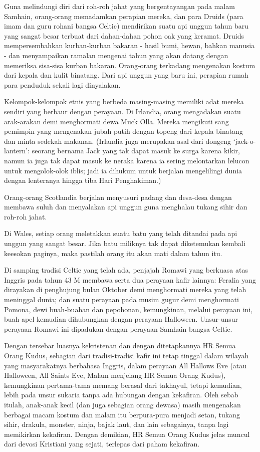 Guna melindungi diri dari roh-roh jahat yang bergentayangan pada malam Samhain, orang-orang memadamkan perapian mereka, dan para Druids (para imam dan guru rohani bangsa Celtic) mendirikan suatu api unggun tahun baru yang sangat besar terbuat dari dahan-dahan pohon oak yang keramat. Druids mempersembahkan kurban-kurban bakaran - hasil bumi, hewan, bahkan manusia - dan menyampaikan ramalan mengenai tahun yang akan datang dengan memeriksa sisa-sisa kurban bakaran. Orang-orang terkadang mengenakan kostum dari kepala dan kulit binatang. Dari api unggun yang baru ini, perapian rumah para penduduk sekali lagi dinyalakan.

Kelompok-kelompok etnis yang berbeda masing-masing memiliki adat mereka sendiri yang berbaur dengan perayaan. Di Irlandia, orang mengadakan suatu arak-arakan demi menghormati dewa Muck Olla. Mereka mengikuti sang pemimpin yang mengenakan jubah putih dengan topeng dari kepala binatang dan minta sedekah makanan. (Irlandia juga merupakan asal dari dongeng `jack-o-lantern': seorang bernama Jack yang tak dapat masuk ke surga karena kikir, namun ia juga tak dapat masuk ke neraka karena ia sering melontarkan lelucon untuk mengolok-olok iblis; jadi ia dihukum untuk berjalan mengelilingi dunia dengan lenteranya hingga tiba Hari Penghakiman.)

Orang-orang Scotlandia berjalan menyusuri padang dan desa-desa dengan membawa suluh dan menyalakan api unggun guna menghalau tukang sihir dan roh-roh jahat.

Di Wales, setiap orang meletakkan suatu batu yang telah ditandai pada api unggun yang sangat besar. Jika batu miliknya tak dapat diketemukan kembali keesokan paginya, maka pastilah orang itu akan mati dalam tahun itu.

Di samping tradisi Celtic yang telah ada, penjajah Romawi yang berkuasa atas Inggris pada tahun 43 M membawa serta dua perayaan kafir lainnya: Feralia yang dirayakan di penghujung bulan Oktober demi menghormati mereka yang telah meninggal dunia; dan suatu perayaan pada musim gugur demi menghormati Pomona, dewi buah-buahan dan pepohonan, kemungkinan, melalui perayaan ini, buah apel kemudian dihubungkan dengan perayaan Halloween. Unsur-unsur perayaan Romawi ini dipadukan dengan perayaan Samhain bangsa Celtic.

Dengan tersebar luasnya kekristenan dan dengan ditetapkannya HR Semua Orang Kudus, sebagian dari tradisi-tradisi kafir ini tetap tinggal dalam wilayah yang masyarakatnya berbahasa Inggris, dalam perayaan All Hallows Eve (atau Halloween, All Saints Eve, Malam menjelang HR Semua Orang Kudus), kemungkinan pertama-tama memang berasal dari takhayul, tetapi kemudian, lebih pada unsur sukaria tanpa ada hubungan dengan kekafiran. Oleh sebab itulah, anak-anak kecil (dan juga sebagian orang dewasa) masih mengenakan berbagai macam kostum dan malam itu berpura-pura menjadi setan, tukang sihir, drakula, monster, ninja, bajak laut, dan lain sebagainya, tanpa lagi memikirkan kekafiran. Dengan demikian, HR Semua Orang Kudus jelas muncul dari devosi Kristiani yang sejati, terlepas dari paham kekafiran.

